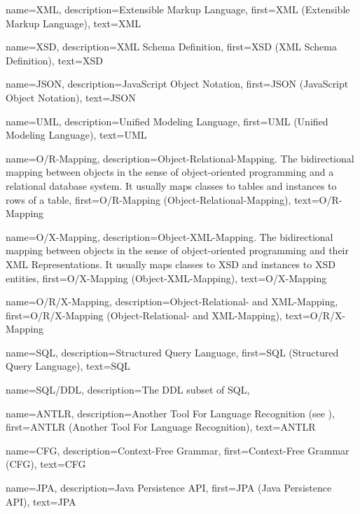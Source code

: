 {
    name=XML,
    description={Extensible Markup Language},
    first={XML (Extensible Markup Language)},
    text={XML}
}

{
    name=XSD,
    description={XML Schema Definition},
    first={XSD (XML Schema Definition)},
    text={XSD}
}

{
    name=JSON,
    description={JavaScript Object Notation},
    first={JSON (JavaScript Object Notation)},
    text={JSON}
}

{
    name=UML,
    description={Unified Modeling Language},
    first={UML (Unified Modeling Language)},
    text={UML}
}

{
    name=O/\-R-Mapping,
    description={Object-Relational-Mapping. The bidirectional mapping between objects in the sense of object-oriented programming and a relational database system. It usually maps classes to tables and instances to rows of a table},
    first={O/R-Mapping (Object-Relational-Mapping)},
    text={O/\-R-Mapping}
}

{
    name=O/\-X-Mapping,
    description={Object-XML-Mapping. The bidirectional mapping between objects in the sense of object-oriented programming and their \gls{XML} \glspl{Representation}. It usually maps classes to \gls{XSD} and instances to \gls{XSD} entities},
    first={O/X-Mapping (Object-XML-Mapping)},
    text={O/\-X-Mapping}
}

{
    name=O/\-R/\-X-Mapping,
    description={Object-Relational- and XML-Mapping},
    first={O/R/X-Mapping (Object-Relational- and XML-Mapping)},
    text={O/\-R/\-X-Mapping}
}

{
    name=SQL,
    description={Structured Query Language},
    first={SQL (Structured Query Language)},
    text={SQL}
}

{
    name=SQL/\-DDL,
    description={The DDL subset of SQL},
}

{
    name=ANTLR,
    description={Another Tool For Language Recognition (see \cite{Parr:2013:DAR:2501720})},
    first={ANTLR (Another Tool For Language Recognition)},
    text={ANTLR}
}

{
    name=CFG,
    description={Context-Free Grammar},
    first={Context-Free Grammar (CFG)},
    text={CFG}
}

{
    name=JPA,
    description={Java Persistence API},
    first={JPA (Java Persistence API)},
    text={JPA}
}

